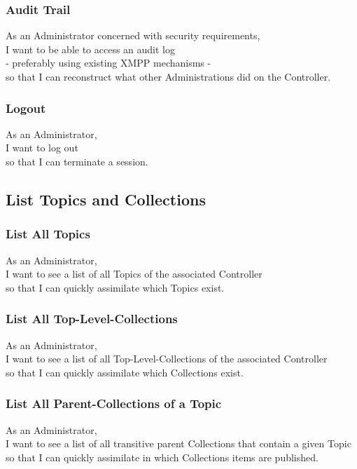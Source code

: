 \subsubsection{Audit Trail}

As an Administrator concerned with security requirements,\\
I want to be able to access an audit log\\
- preferably using existing XMPP mechanisms - \\
so that I can reconstruct what other Administrations did on the Controller.

\subsubsection{Logout}

As an Administrator,\\
I want to log out\\
so that I can terminate a session.

\subsection{List Topics and Collections}

\subsubsection{List All Topics}
As an Administrator,\\
I want to see a list of all Topics of the associated Controller\\
so that I can quickly assimilate which Topics exist.

\subsubsection{List All Top-Level-Collections}
As an Administrator,\\
I want to see a list of all Top-Level-Collections of the associated Controller\\
so that I can quickly assimilate which Collections exist.

\subsubsection{List All Parent-Collections of a Topic}
As an Administrator,\\
I want to see a list of all transitive parent Collections that contain a given Topic\\
so that I can quickly assimilate in which Collections items are published.

